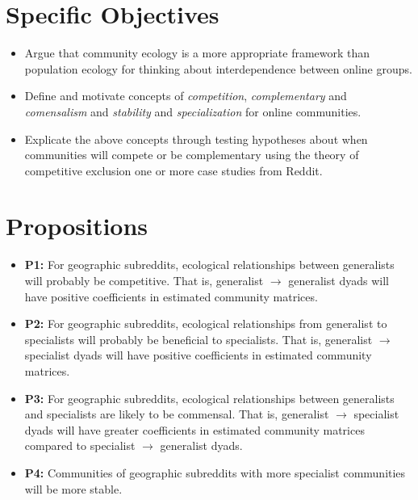 \documentclass[12pt]{memoir}
\begin{document}
\section{Specific Objectives}
\begin{itemize}

\item Argue that community ecology is a more appropriate framework than population ecology for thinking about interdependence between online groups.

\item Define and motivate concepts of \emph{competition}, \emph{complementary} and \emph{comensalism} and \emph{stability} and \emph{specialization} for online communities.

\item Explicate the above concepts through testing hypotheses about when communities will compete or be complementary using the theory of competitive exclusion one or more case studies from Reddit.

\end{itemize}

\section{Propositions}

\begin{itemize}
\item \textbf{P1:} For geographic subreddits, ecological relationships between generalists will probably be competitive. That is, generalist $\rightarrow$ generalist dyads will have positive coefficients in estimated community matrices. 

\item \textbf{P2:} For geographic subreddits, ecological relationships from generalist to specialists will probably be beneficial to specialists. That is, generalist $\rightarrow$ specialist dyads will have positive coefficients in estimated community matrices.


\item \textbf{P3:} For geographic subreddits, ecological relationships between generalists and specialists are likely to be commensal. That is, generalist $\rightarrow$ specialist dyads will have greater coefficients in estimated community matrices compared to specialist $\rightarrow$ generalist dyads. 

\item \textbf{P4:} Communities of geographic subreddits with more specialist communities will be more stable.
\end{itemize}
\end{document}
